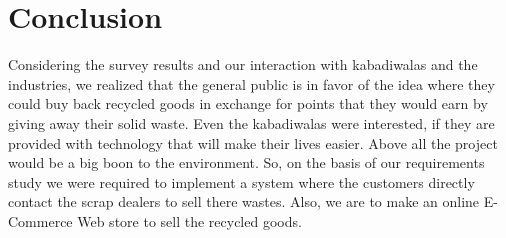 \documentclass{article}
\begin{document}
\section{Conclusion}
\par Considering the survey results and our interaction with kabadiwalas and the industries, we realized that the general public is in favor of the idea where they could buy back recycled goods in exchange for points that they would earn by giving away their solid waste. Even the kabadiwalas were interested, if they are provided with technology that will make their lives easier. Above all the project would be a big boon to the environment. So, on the basis of our requirements study we were required to implement a system where the customers directly contact the scrap dealers to sell there wastes. Also, we are to make an online E-Commerce Web store to sell the recycled goods.
\end{document}
